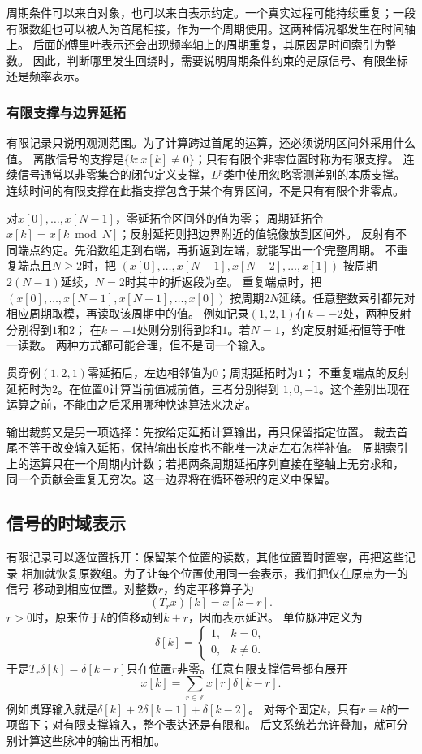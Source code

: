 周期条件可以来自对象，也可以来自表示约定。一个真实过程可能持续重复；一段
有限数组也可以被人为首尾相接，作为一个周期使用。这两种情况都发生在时间轴上。
后面的傅里叶表示还会出现频率轴上的周期重复，其原因是时间索引为整数。
因此，判断哪里发生回绕时，需要说明周期条件约束的是原信号、有限坐标还是频率表示。

\subsubsection{有限支撑与边界延拓}

有限记录只说明观测范围。为了计算跨过首尾的运算，还必须说明区间外采用什么值。
离散信号的支撑是$\{k:x[k]\neq0\}$；只有有限个非零位置时称为有限支撑。
连续信号通常以非零集合的闭包定义支撑，$L^p$类中使用忽略零测差别的本质支撑。
连续时间的有限支撑在此指支撑包含于某个有界区间，不是只有有限个非零点。

对$x[0],\ldots,x[N-1]$，零延拓令区间外的值为零；
周期延拓令$x[k]=x[k\bmod N]$；反射延拓则把边界附近的值镜像放到区间外。
反射有不同端点约定。先沿数组走到右端，再折返到左端，就能写出一个完整周期。
不重复端点且$N\geq2$时，把
$(x[0],\ldots,x[N-1],x[N-2],\ldots,x[1])$
按周期$2(N-1)$延续，$N=2$时其中的折返段为空。
重复端点时，把$(x[0],\ldots,x[N-1],x[N-1],\ldots,x[0])$
按周期$2N$延续。任意整数索引都先对相应周期取模，再读取该周期中的值。
例如记录$(1,2,1)$在$k=-2$处，两种反射分别得到$1$和$2$；
在$k=-1$处则分别得到$2$和$1$。若$N=1$，约定反射延拓恒等于唯一读数。
两种方式都可能合理，但不是同一个输入。

贯穿例$(1,2,1)$零延拓后，左边相邻值为$0$；周期延拓时为$1$；
不重复端点的反射延拓时为$2$。在位置$0$计算当前值减前值，三者分别得到
$1,0,-1$。这个差别出现在运算之前，不能由之后采用哪种快速算法来决定。

输出裁剪又是另一项选择：先按给定延拓计算输出，再只保留指定位置。
裁去首尾不等于改变输入延拓，保持输出长度也不能唯一决定左右怎样补值。
周期索引上的运算只在一个周期内计数；若把两条周期延拓序列直接在整轴上无穷求和，
同一个贡献会重复无穷次。这一边界将在循环卷积的定义中保留。

\subsection{信号的时域表示}
\label{sec:signal-time-impulses}

有限记录可以逐位置拆开：保留某个位置的读数，其他位置暂时置零，再把这些记录
相加就恢复原数组。为了让每个位置使用同一套表示，我们把仅在原点为一的信号
移动到相应位置。对整数$r$，约定平移算子为
\[
  (T_rx)[k]=x[k-r].
\]
$r>0$时，原来位于$k$的值移动到$k+r$，因而表示延迟。
单位脉冲定义为
\[
  \delta[k]=
  \begin{cases}
    1,&k=0,\\
    0,&k\neq0.
  \end{cases}
\]
于是$T_r\delta[k]=\delta[k-r]$只在位置$r$非零。任意有限支撑信号都有展开
\begin{equation}
  x[k]=\sum_{r\in\mathbb Z}x[r]\delta[k-r].
  \label{eq:signal-analysis-impulse-expansion}
\end{equation}
例如贯穿输入就是$\delta[k]+2\delta[k-1]+\delta[k-2]$。
对每个固定$k$，只有$r=k$的一项留下；对有限支撑输入，整个表达还是有限和。
后文系统若允许叠加，就可分别计算这些脉冲的输出再相加。

